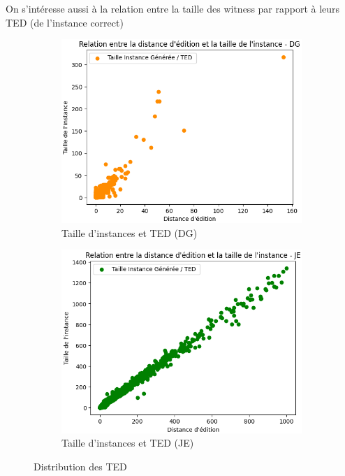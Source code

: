         On s'intéresse aussi à la relation entre la taille des witness par rapport à leurs TED (de l'instance correct) 
        \begin{figure}[H]
          \begin{subfigure}[t]{0.45\linewidth}
            \includegraphics[scale=0.45]{Photos/ted_vs_errors/taille_vs_ted_dg.PNG}
            \caption{Taille d'instances et TED (DG)}
          \end{subfigure}
          \hfill
          \begin{subfigure}[t]{0.45\linewidth}
            \includegraphics[scale=0.45]{Photos/ted_vs_errors/taille_vs_ted_je.PNG}
            \caption{Taille d'instances et TED (JE)}
          \end{subfigure}
          
          
          \caption{Distribution des TED}
          \label{fig:ted_vs_taille}
        \end{figure}
